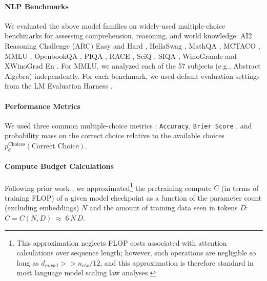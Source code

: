 \paragraph{NLP Benchmarks} We evaluated the above model families on widely-used multiple-choice benchmarks for assessing comprehension, reasoning, and world knowledge: AI2 Reasoning Challenge (ARC) Easy and Hard \citep{clark2018arc}, HellaSwag \citep{zellers2019hellaswag}, MathQA \citep{amini2019mathqa}, MCTACO \citep{zhou2019mctaco}, MMLU \citep{hendrycks2020mmlu}, OpenbookQA \citep{mihaylov2018openbookqa}, PIQA \citep{bisk2020piqa}, RACE \citep{lai2017race}, SciQ \citep{welbl2017sciq}, SIQA \citep{sap2019social},  WinoGrande \citep{keisuke2019winogrande} and XWinoGrad En \citep{muennighoff2023xwinograd}. For MMLU, we analyzed each of the 57 subjects (e.g., Abstract Algebra) independently. For each benchmark, we used default evaluation settings from the LM Evaluation Harness \citep{eleuther2023evalharness}. 

\paragraph{Performance Metrics} We used three common multiple-choice metrics \citep{srivastava2022beyond,schaeffer2023mirage,du2024understanding}: \texttt{Accuracy}, \texttt{Brier Score} \citep{brier1950verification}, and probability mass on the correct choice relative to the available choices $p_{\theta}^{\text{Choices}}(\text{Correct Choice})$.

\paragraph{Compute Budget Calculations}

Following prior work \citep{kaplan2020scaling}, we approximated\footnote{This approximation neglects FLOP costs associated with attention calculations over sequence length; however, such operations are negligible so long as $d_{model} >> n_{ctx} / 12$, and this approximation is therefore standard in most language model scaling law analyses.} the pretraining compute $C$ (in terms of training FLOP) of a given model checkpoint as a function of the parameter count (excluding embeddings) $N$ and the amount of training data seen in tokens $D$: $C = C(N, D) \; \approx \; 6 \, N\, D$.

